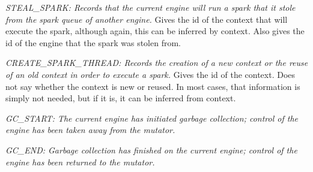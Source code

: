 \emph{STEAL\_SPARK:
Records that the current engine will run a spark
that it stole from the spark queue of another engine.}
Gives the id of the context that will execute the spark,
although again, this can be inferred by context.
Also gives the id of the engine that the spark was stolen from.

\emph{CREATE\_SPARK\_THREAD:
Records the creation of a new context or the reuse of an old context
in order to execute a spark.}
Gives the id of the context.
Does not say whether the context is new or reused.
In most cases, that information is simply not needed,
but if it is, it can be inferred from context.

\emph{GC\_START:
The current engine has initiated garbage collection;
control of the engine has been taken away from the mutator.}

\emph{GC\_END:
Garbage collection has finished on the current engine;
control of the engine has been returned to the mutator.}



